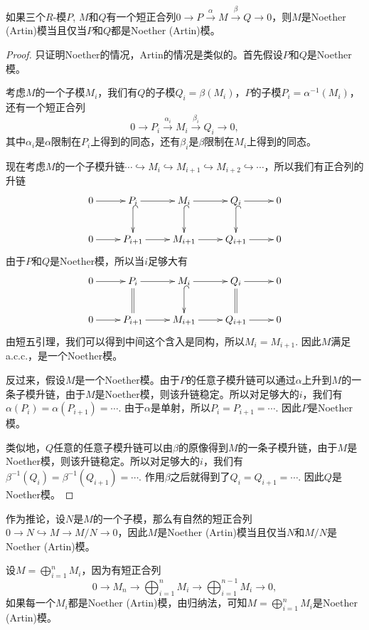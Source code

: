 \begin{pro}
如果三个$R$-模$P$, $M$和$Q$有一个短正合列$0\to P\xrightarrow{\alpha} M\xrightarrow{\beta} Q\to 0$，则$M$是Noether (Artin)模当且仅当$P$和$Q$都是Noether (Artin)模。
\end{pro}

\begin{proof}
只证明Noether的情况，Artin的情况是类似的。首先假设$P$和$Q$是Noether模。

考虑$M$的一个子模$M_i$，我们有$Q$的子模$Q_i=\beta(M_i)$，$P$的子模$P_i=\alpha^{-1}(M_i)$，还有一个短正合列
\[
	0\to P_i \xrightarrow{\alpha_i} M_i \xrightarrow{\beta_i} Q_i \to 0,
\]
其中$\alpha_i$是$\alpha$限制在$P_i$上得到的同态，还有$\beta_i$是$\beta$限制在$M_i$上得到的同态。

现在考虑$M$的一个子模升链$\cdots\hookrightarrow M_i\hookrightarrow M_{i+1}\hookrightarrow M_{i+2}\hookrightarrow \cdots$，所以我们有正合列的升链
\[
	\xymatrix{
	0\ar[r]&P_i\ar[r]\ar@{^{(}->}[d]&M_i\ar[r]\ar@{^{(}->}[d]&Q_i\ar@{^{(}->}[d]\ar[r]&0\\
	0\ar[r]&P_{i+1}\ar[r]&M_{i+1}\ar[r]&Q_{i+1}\ar[r]&0
	}
\]
由于$P$和$Q$是Noether模，所以当$i$足够大有
\[
	\xymatrix{
	0\ar[r]&P_i\ar[r]\ar@{=}[d]&M_i\ar[r]\ar@{^{(}->}[d]&Q_i\ar@{=}[d]\ar[r]&0\\
	0\ar[r]&P_{i+1}\ar[r]&M_{i+1}\ar[r]&Q_{i+1}\ar[r]&0
	}
\]
由短五引理，我们可以得到中间这个含入是同构，所以$M_i=M_{i+1}$. 因此$M$满足a.c.c.，是一个Noether模。

反过来，假设$M$是一个Noether模。由于$P$的任意子模升链可以通过$\alpha$上升到$M$的一条子模升链，由于$M$是Noether模，则该升链稳定。所以对足够大的$i$，我们有$\alpha(P_i)=\alpha(P_{i+1})=\cdots$. 由于$\alpha$是单射，所以$P_i=P_{i+1}=\cdots$. 因此$P$是Noether模。

类似地，$Q$任意的任意子模升链可以由$\beta$的原像得到$M$的一条子模升链，由于$M$是Noether模，则该升链稳定。所以对足够大的$i$，我们有$\beta^{-1}(Q_i)=\beta^{-1}(Q_{i+1})=\cdots$. 作用$\beta$之后就得到了$Q_i=Q_{i+1}=\cdots$. 因此$Q$是Noether模。
\end{proof}

作为推论，设$N$是$M$的一个子模，那么有自然的短正合列$0\to N\hookrightarrow M\to M/N\to 0$，因此$M$是Noether (Artin)模当且仅当$N$和$M/N$是Noether (Artin)模。

设$M=\bigoplus_{i=1}^nM_i$，因为有短正合列
\[
	0\to M_n\to \bigoplus_{i=1}^nM_i\to \bigoplus_{i=1}^{n-1}M_i\to 0,
\]
如果每一个$M_i$都是Noether (Artin)模，由归纳法，可知$M=\bigoplus_{i=1}^nM_i$是Noether (Artin)模。

